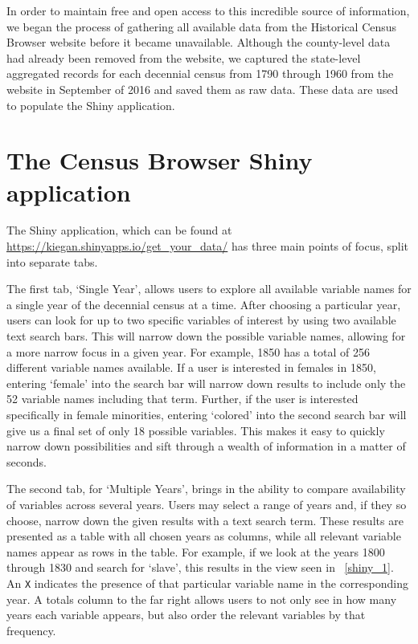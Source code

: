 \documentclass[DIV=calc, paper=a4, fontsize=10pt, twocolumn]{scrartcl}\usepackage[]{graphicx}\usepackage[]{color}
\begin{document}
\par In order to maintain free and open access to this incredible source of information, we began the process of gathering all available data from the Historical Census Browser website before it became unavailable. Although the county-level data had already been removed from the website, we captured the state-level aggregated records for each decennial census from 1790 through 1960 from the website in September of 2016 and saved them as raw data. These data are used to populate the Shiny application.  


\section*{The Census Browser Shiny application}  

\par The Shiny application, which can be found at \url{https://kiegan.shinyapps.io/get_your_data/} has three main points of focus, split into separate tabs. 

\par The first tab, `Single Year', allows users to explore all available variable names for a single year of the decennial census at a time. After choosing a particular year, users can look for up to two specific variables of interest by using two available text search bars. This will narrow down the possible variable names, allowing for a more narrow focus in a given year. For example, 1850 has a total of 256 different variable names available. If a user is interested in females in 1850, entering `female' into the search bar will narrow down results to include only the 52 variable names including that term. Further, if the user is interested specifically in female minorities, entering `colored' into the second search bar will give us a final set of only 18 possible variables. This makes it easy to quickly narrow down possibilities and sift through a wealth of information in a matter of seconds.  

\par The second tab, for `Multiple Years', brings in the ability to compare availability of variables across several years. Users may select a range of years and, if they so choose, narrow down the given results with a text search term. These results are presented as a table with all chosen years as columns, while all relevant variable names appear as rows in the table. For example, if we look at the years 1800 through 1830 and search for `slave', this results in the view seen in ~\autoref{shiny_1}. An \texttt{X} indicates the presence of that particular variable name in the corresponding year. A totals column to the far right allows users to not only see in how many years each variable appears, but also order the relevant variables by that frequency.  
\end{document}
